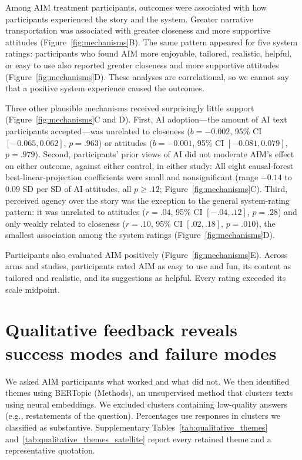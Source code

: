 \documentclass[11pt]{article}
\begin{document}
Among AIM treatment participants, outcomes were associated with how participants experienced the story and the system. Greater narrative transportation was associated with greater closeness and more supportive attitudes (Figure~\ref{fig:mechanisms}B). The same pattern appeared for five system ratings: participants who found AIM more enjoyable, tailored, realistic, helpful, or easy to use also reported greater closeness and more supportive attitudes (Figure~\ref{fig:mechanisms}D). These analyses are correlational, so we cannot say that a positive system experience caused the outcomes.

Three other plausible mechanisms received surprisingly little support (Figure~\ref{fig:mechanisms}C and D). First, AI adoption---the amount of AI text participants accepted---was unrelated to closeness ($b=-0.002$, 95\% CI $[-0.065,0.062]$, $p=.963$) or attitudes ($b=-0.001$, 95\% CI $[-0.081,0.079]$, $p=.979$). Second, participants' prior views of AI did not moderate AIM's effect on either outcome, against either control, in either study: All eight causal-forest best-linear-projection coefficients were small and nonsignificant (range $-0.14$ to $0.09$ SD per SD of AI attitudes, all $p\geq.12$; Figure~\ref{fig:mechanisms}C). Third, perceived agency over the story was the exception to the general system-rating pattern: it was unrelated to attitudes ($r=.04$, 95\% CI $[-.04,.12]$, $p=.28$) and only weakly related to closeness ($r=.10$, 95\% CI $[.02,.18]$, $p=.010$), the smallest association among the system ratings (Figure~\ref{fig:mechanisms}D).

Participants also evaluated AIM positively  (Figure~\ref{fig:mechanisms}E). Across arms and studies, participants rated AIM as easy to use and fun, its content as tailored and realistic, and its suggestions as helpful. Every rating exceeded its scale midpoint.



\section{Qualitative feedback reveals success modes and failure modes}
\label{sec:success-modes-and-failure-modes-in-study-1}
\label{sec:qualitative-analysis}

We asked AIM participants what worked and what did not. We then identified themes using BERTopic (Methods), an unsupervised method that clusters texts using neural embeddings. We excluded clusters containing low-quality answers (e.g., restatements of the question). Percentages use responses in clusters we classified as substantive. Supplementary Tables~\ref{tab:qualitative_themes} and~\ref{tab:qualitative_themes_satellite} report every retained theme and a representative quotation.
\end{document}
